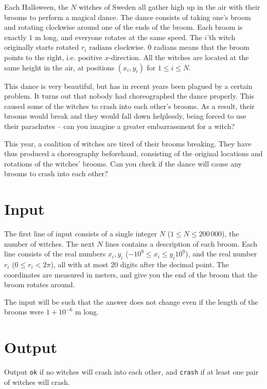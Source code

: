 Each Halloween, the $N$ witches of Sweden all gather high up in the air with their brooms to perform a magical dance.
The dance consists of taking one's broom and rotating clockwise around one of the ends of the broom.
Each broom is exactly $1\text{ m}$ long, and everyone rotates at the same speed.
The $i$'th witch originally starts rotated $r_i\text{ radians}$ clockwise.
0 radians means that the broom points to the right, i.e. positive $x$-direction.
All the witches are located at the same height in the air, at positions $(x_i, y_i)$ for $1 \le i \le N$.

This dance is very beautiful, but has in recent years been plagued by a certain problem.
It turns out that nobody had choreographed the dance properly.
This caused some of the witches to crash into each other's brooms.
As a result, their brooms would break and they would fall down helplessly, being forced to use their parachutes -- can you imagine a greater embarrassment for a witch?

This year, a coalition of witches are tired of their brooms breaking.
They have thus produced a choreography beforehand, consisting of the original locations and rotations of the witches' brooms.
Can you check if the dance will cause any brooms to crash into each other?

\section*{Input}
The first line of input consists of a single integer $N$ ($1 \le N \le 200\,000$), the number of witches.
The next $N$ lines contains a description of each broom.
Each line consists of the real numbers $x_i, y_i$ ($-10^{9} \le x_i \le y_i 10^{9}$), and the real number $r_i$ ($0 \le r_i < 2\pi$), all with at most $20$ digits after the decimal point.
The coordinates are measured in meters, and give you the end of the broom that the broom rotates around.

The input will be such that the answer does not change even if the length of the brooms were $1 + 10^{-6}\text{ m}$ long.

\section*{Output}
Output \texttt{ok} if no witches will crash into each other, and \texttt{crash} if at least one pair of witches will crash.
